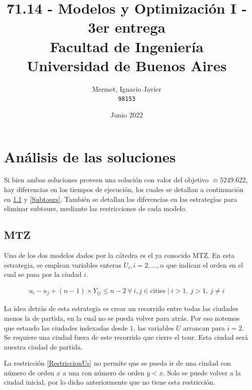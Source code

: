 \documentclass[titlepage,a4paper,oneside]{article}
\begin{document}
\begin{titlepage}
\title{
	71.14 \-- Modelos y Optimización I \-- 3er entrega\\
    \large Facultad de Ingeniería\\
	Universidad de Buenos Aires
}
\author{
	Mermet, Ignacio Javier\\
	\texttt{98153}
}
\date{Junio 2022}

\maketitle

\end{titlepage}

\tableofcontents

\newpage

\section{Análisis de las soluciones}
Si bien ambas soluciones proveen una solución con valor del objetivo $\approx 5249.622$, hay diferencias en los tiempos de ejecución, los cuales se detallan a continuación en \ref{MTZ} y \ref{Subtours}. También se detallan las diferencias en las estrategias para eliminar subtours, mediante las restricciones de cada modelo.

\subsection{MTZ}\label{MTZ}
Uno de los dos modelos dados por la cátedra es el ya conocido MTZ. En esta estrategia, se emplean variables enteras $U_i, i=2,\ldots,n$ que indican el orden en el cual se pasa por la ciudad $i$.

\begin{align}\label{RestriccionUs}
	u_i - u_j + \left(n-1\right) \times Y_{ij} \leq n - 2~\forall~i,j \in \text{cities} \mid i > 1,~j > 1,~j \neq i
\end{align}

La idea detrás de esta estrategia es crear un recorrido entre todas las ciudades menos la de partida, en la cual no se pueda volver para atrás. Por eso notemos que estando las ciudades indexadas desde $1$, las variables $U$ arrancan para $i=2$. Se requiere una ciudad fuera de este recorrido que cierre el tour. Esta ciudad será nuestra ciudad de partida.

La restricción \ref{RestriccionUs} no permite que se pueda ir de una ciudad con número de orden $x$ a una con número de orden $y < x$. Solo se puede volver a la ciudad inicial, por lo dicho anteriormente que no tiene esta restricción.
\end{document}
